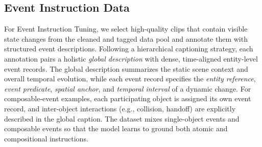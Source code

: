 \subsection{Event Instruction Data}
\label{sec:event-data}

For Event Instruction Tuning, we select high-quality clips that contain visible state
changes from the cleaned and tagged data pool and annotate them with structured event
descriptions.
Following a hierarchical captioning strategy, each annotation pairs a holistic
\emph{global description} with dense, time-aligned entity-level event records.
The global description summarizes the static scene context and overall temporal evolution,
while each event record specifies the \emph{entity reference}, \emph{event predicate},
\emph{spatial anchor}, and \emph{temporal interval} of a dynamic change.
For composable-event examples, each participating object is assigned its own event record,
and inter-object interactions (e.g., collision, handoff) are explicitly described in the
global caption.
The dataset mixes single-object events and composable events so that the model learns to
ground both atomic and compositional instructions.
